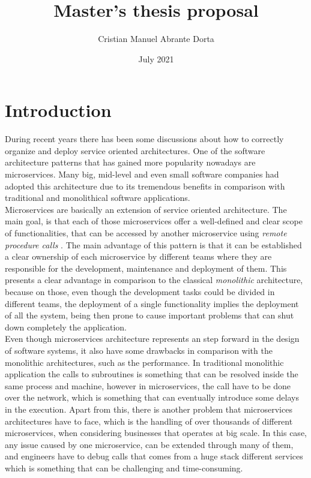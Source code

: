 \documentclass[12pt]{article}
\title{Master's thesis proposal}
\author{Cristian Manuel Abrante Dorta}
\date{July 2021}
\begin{document}
\maketitle

\section{Introduction}

During recent years there has been some discussions about how to correctly organize and deploy service oriented architectures. One of the software architecture patterns that has gained more popularity nowadays are microservices. Many big, mid-level and even small software companies had adopted this architecture due to its tremendous benefits in comparison with traditional and monolithical software applications. \\

Microservices are basically an extension of service oriented architecture. The main goal, is that each of those microservices offer a well-defined and clear scope of functionalities, that can be accessed by another microservice using \textit{remote procedure calls} \cite{nelson1981remote}. The main advantage of this pattern is that it can be established a clear ownership of each microservice by different teams where they are responsible for the development, maintenance and deployment of them. This presents a clear advantage in comparison to the classical \textit{monolithic} architecture, because on those, even though the development tasks could be divided in different teams, the deployment of a single functionality implies the deployment of all the system, being then prone to cause important problems that can shut down completely the application. \\

Even though microservices architecture represents an step forward in the design of software systems, it also have some drawbacks in comparison with the monolithic architectures, such as the performance. In traditional monolithic application the calls to subroutines is something that can be resolved inside the same process and machine, however in microservices, the call have to be done over the network, which is something that can eventually introduce some delays in the execution. Apart from this, there is another problem that microservices architectures have to face, which is the handling of over thousands of different microservices, when considering businesses that operates at big scale. In this case, any issue caused by one microservice, can be extended through many of them, and engineers have to debug calls that comes from a huge stack different services which is something that can be challenging and time-consuming.\\
\end{document}
